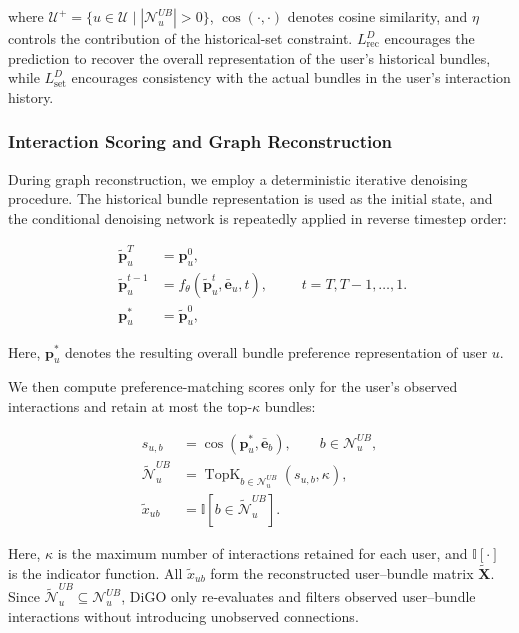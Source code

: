 \documentclass[letterpaper]{article}
\begin{document}
where
$\mathcal U^{+}
=
\{u\in\mathcal U\mid|\mathcal N_u^{UB}|>0\}$,
$\cos(\cdot,\cdot)$ denotes cosine similarity, and $\eta$
controls the contribution of the historical-set constraint.
$L_{\mathrm{rec}}^{D}$ encourages the prediction to recover the
overall representation of the user's historical bundles, while
$L_{\mathrm{set}}^{D}$ encourages consistency with the actual
bundles in the user's interaction history.


\subsubsection{Interaction Scoring and Graph Reconstruction}

During graph reconstruction, we employ a deterministic iterative
denoising procedure. The historical bundle representation is used
as the initial state, and the conditional denoising network is
repeatedly applied in reverse timestep order:

\begin{equation}
\begin{aligned}
\widetilde{\mathbf p}_u^{T}
&=
\mathbf p_u^0,
\\
\widetilde{\mathbf p}_u^{t-1}
&=
f_\theta
\left(
\widetilde{\mathbf p}_u^{t},
\bar{\mathbf e}_u,
t
\right),
\\
\mathbf p_u^{*}
&=
\widetilde{\mathbf p}_u^{0},
\end{aligned}
\qquad
t=T,T-1,\ldots,1.
\tag{5}
\end{equation}

Here, $\mathbf p_u^{*}$ denotes the resulting overall bundle
preference representation of user $u$.

We then compute preference-matching scores only for the user's
observed interactions and retain at most the top-$\kappa$
bundles:

\begin{equation}
\begin{aligned}
s_{u,b}
&=
\cos
\left(
\mathbf p_u^{*},
\bar{\mathbf e}_b
\right),
\qquad
b\in\mathcal N_u^{UB},
\\
\widetilde{\mathcal N}_u^{UB}
&=
\operatorname{TopK}_{b\in\mathcal N_u^{UB}}
\left(
s_{u,b},
\kappa
\right),
\\
\widetilde{x}_{ub}
&=
\mathbb I
\left[
b\in\widetilde{\mathcal N}_u^{UB}
\right].
\end{aligned}
\tag{6}
\end{equation}

Here, $\kappa$ is the maximum number of interactions retained for
each user, and $\mathbb I[\cdot]$ is the indicator function. All
$\widetilde{x}_{ub}$ form the reconstructed user--bundle matrix
$\widetilde{\mathbf X}$. Since
$\widetilde{\mathcal N}_u^{UB}
\subseteq
\mathcal N_u^{UB}$,
DiGO only re-evaluates and filters observed user--bundle
interactions without introducing unobserved connections.
\end{document}
